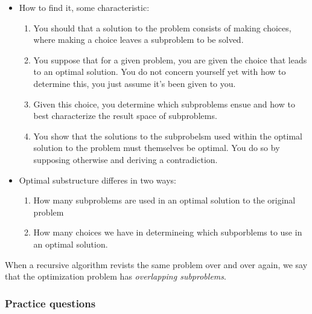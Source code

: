 \documentclass[a4paper,11pt]{article}
\begin{document}
\begin{itemize}
\itemsep1pt\parskip0pt
\item
  How to find it, some characteristic:

  \begin{enumerate}
  \def\labelenumi{\arabic{enumi}.}
  \itemsep1pt\parskip0pt
  \item
    You should that a solution to the problem consists of making
    choices, where making a choice leaves a subproblem to be solved.
  \item
    You suppose that for a given problem, you are given the choice that
    leads to an optimal solution. You do not concern yourself yet with
    how to determine this, you just assume it's been given to you.
  \item
    Given this choice, you determine which subproblems ensue and how to
    best characterize the result space of subproblems.
  \item
    You show that the solutions to the subprobelsm used within the
    optimal\\ solution to the problem must themselves be optimal. You do
    so by supposing otherwise and deriving a contradiction.
  \end{enumerate}
\item
  Optimal substructure differes in two ways:

  \begin{enumerate}
  \def\labelenumi{\arabic{enumi}.}
  \itemsep1pt\parskip0pt
  \item
    How many subproblems are used in an optimal solution to the original
    problem
  \item
    How many choices we have in determineing which subporblems to use in
    an optimal solution.
  \end{enumerate}
\end{itemize}

\begin{description}
\itemsep1pt\parskip0pt
\item[Overlapping subproblems]
When a recursive algorithm revists the same problem over and over again,
we say that the optimization problem has \emph{overlapping subproblems}.
\end{description}

\subsubsection{Practice questions}\label{practice-questions-10}
\end{document}
